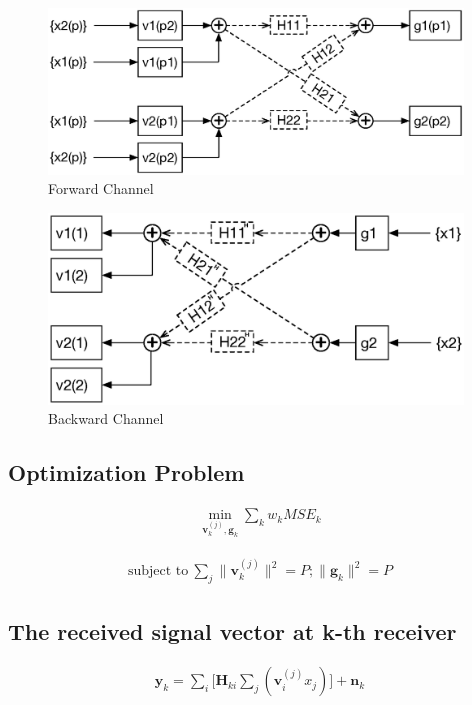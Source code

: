 \documentclass[11pt, oneside]{article}   	%
\begin{document}
 \begin{figure}[h]
    \centering
    \centerline{\includegraphics[width=110mm]{forward_channel_2}}
    \caption{Forward Channel}
\end{figure} 

\begin{figure}[h]
    \centering
    \centerline{\includegraphics[width=110mm]{backward_channel_2}}
    \caption{Backward Channel}
\end{figure} 

\subsection{Optimization Problem}
\begin{align*}
\min_{\textbf{v}_{k}^{(j)} ,\textbf{g}_{k}} \displaystyle\sum_{k} 	w_k	MSE_{k}	
\end{align*}

\begin{align*}
\text{subject to}  \ \displaystyle\sum_{j}	\|	\textbf{v}^{(j)}_{k}	\|^{2} = P; \| \textbf{g}_{k}	\|^{2} = P
\end{align*}

\subsection{The received signal vector at k-th receiver}
\begin{align*}
\textbf{y}_{k}  = \displaystyle\sum_{i}		\bigg[	\textbf{H}_{ki}	\displaystyle\sum_{j}	(\textbf{v}^{(j)}_{i}	x_j)		\bigg]	+\textbf{n}_{k}
\end{align*}
\end{document}
